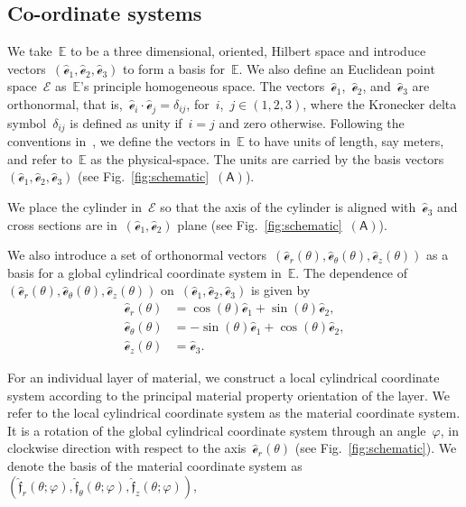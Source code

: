 \documentclass[preprint,12pt,times,draft]{elsarticle}
\numberwithin{equation}{section}
\newcommand{\physe}{\hat{\mathscr{e}}} %
\newcommand{\physf}{\hat{\boldsymbol{\mathfrak{f}}}}
\newcommand{\pr}[1]{\left( #1 \right)}
\newcommand{\subf}[1]{\pr{\textsf{#1}}}
\renewcommand{\>}{$\Rightarrow$}
\begin{document}
\subsection{Co-ordinate systems}
We take~$\mathbb{E}$ to be a three dimensional, oriented, Hilbert space and introduce vectors~$(\physe_1,\physe_2,\physe_3)$ to form a basis for~$\mathbb{E}$. We also define an Euclidean point space~$\mathcal{E}$ as~$\mathbb{E}$'s principle homogeneous space.
The vectors~$\physe_1$,~$\physe_2$, and~$\physe_3$ are orthonormal, that is,~$\physe_i\cdot\physe_j=\delta_{ij}$, for~$i$,~$j\in (1,2,3)$, where the Kronecker delta symbol~$\delta_{ij}$ is defined as unity if~$i=j$ and zero otherwise.
Following the conventions in~\cite{rahaman2020accelerometer,deng2021angle}, we define the vectors in~$\mathbb{E}$ to have units of length, say meters, and refer to~$\mathbb{E}$ as the physical-space. The units are carried by the basis vectors~$(\physe_1,\physe_2,\physe_3)$ (see Fig.~\ref{fig:schematic}~$\subf{A}$).

We place the cylinder in~$\mathcal{E}$ so that the axis of the cylinder is aligned with~$\physe_3$ and cross sections are in~$(\physe_1,\physe_2)$ plane (see Fig.~\ref{fig:schematic}~$\subf{A}$).

We also introduce a set of orthonormal vectors~$(\physe_{r}(\theta),\physe_{\theta}(\theta),\physe_{z}(\theta))$ as a basis for a global cylindrical coordinate system in~$\mathbb{E}$. The dependence of~$(\physe_{r}(\theta),\physe_{\theta}(\theta),\physe_{z}(\theta))$ on~$(\physe_1,\physe_2,\physe_3)$ is given by
\begin{subequations}
\begin{align}
\physe_{r}(\theta) & = \cos(\theta) \physe_1 + \sin(\theta) \physe_2 , \\
\physe_{\theta}(\theta) & = -\sin(\theta) \physe_1 + \cos(\theta) \physe_2 , \\
\physe_{z} (\theta) & =  \physe_3.
\end{align}
\end{subequations}

For an individual layer of material, we construct a local cylindrical coordinate system according to the principal material property orientation of the layer. We refer to the local cylindrical coordinate system as the material coordinate system. It is a rotation of the global cylindrical coordinate system through an angle~$\varphi$, in clockwise direction with respect to the axis~$\physe_{r}(\theta)$ (see Fig.~\ref{fig:schematic}). We denote the basis of the material coordinate system as~$\pr{\physf_{r}(\theta;\varphi),\physf_{\theta}(\theta;\varphi),\physf_{z}(\theta;\varphi)}$,
\end{document}
